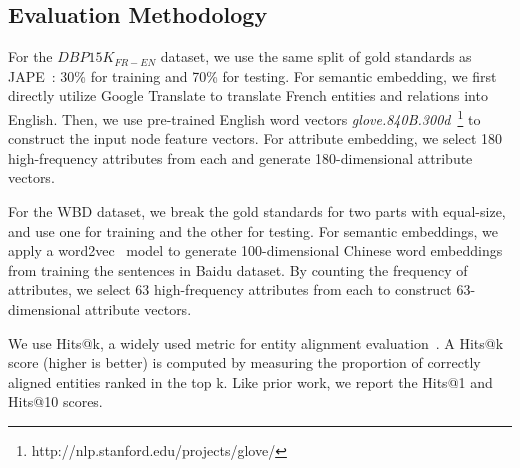	\subsection{Evaluation Methodology}
    	For the $DBP15K_{FR-EN}$ dataset, we use the same split of gold standards as JAPE~\cite{sun2017cross}: 30\% for training and 70\% for
    testing.
	For semantic embedding, we first directly utilize Google Translate to translate French entities and relations into English.
	Then, we use pre-trained English word vectors \emph{glove.840B.300d}~\footnote{http://nlp.stanford.edu/projects/glove/} to construct the input node feature vectors.
	For attribute embedding, we select 180 high-frequency attributes from each \KG and generate 180-dimensional attribute vectors.	


	For the WBD dataset, we break the gold standards for two parts with equal-size, and use one for training and the other for testing.
	For semantic embeddings, we apply a word2vec~\cite{Mikolov2013Efficient} model to generate 100-dimensional Chinese word embeddings from training the sentences in Baidu dataset.
	By counting the frequency of attributes, we select 63 high-frequency attributes from each \KG to construct 63-dimensional attribute vectors.



	
 	We use Hits@k, a widely used metric for entity
 alignment evaluation~\cite{hao2016joint,chen2016multilingual,sun2017cross,zhu2017iterative}. A Hits@k score (higher is better) is computed by
 measuring the proportion of correctly aligned entities ranked in the top k. Like prior work, we report the Hits@1 and Hits@10 scores.
	
